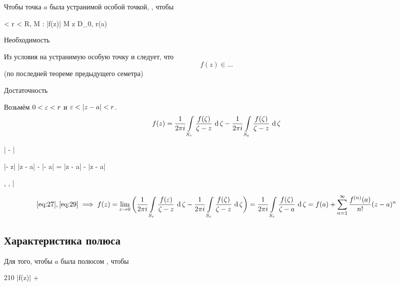 \begin{theorem}
	Чтобы точка $ a $ была устранимой особой точкой, , чтобы
	\begin{equ}{26}
		 < r < R, \quad \exist M : \quad |f(z)| \le M \quad \forall z \in D_{0, r}(a)
	\end{equ}
\end{theorem}

\begin{eproof}
	\item Необходимость

	Из условия на устранимую особую точку и  следует, что
	$$ f(z) \in \dots $$
	(по последней теореме предыдущего семетра)
	\item Достаточность

	Возьмём $ 0 < \veps < r $ и $ \veps < |z - a| < r $.
	$$ f(z) = \frac1{2\pi i} \cint[\zeta]{S_r}{\frac{f(\zeta)}{\zeta - z}} - \frac1{2\pi i}\cint[\zeta]{S_\veps}{\frac{f(\zeta)}{\zeta - z}} $$
	\begin{equ}{27}
		\bigg| -  \bigg| \le {} 
	\end{equ}
	\begin{equ}{28}
		|\zeta - z| \ge |z - a| - |\zeta - a| = |z - a| - \veps \ge {}|z - a|
	\end{equ}
	\begin{equ}{29}
		, ,  \implies \bigg| %
	\end{equ}
	$$ \eref{27}, \eref{29} \implies f(z) = \liml{\veps \to 0} \bigg( \frac1{2\pi i} \cint[\zeta]{S_r}{\frac{f(\veps)}{\zeta - z}} - \frac1{2\pi i} \cint[\zeta]{S_\veps}{\frac{f(\zeta)}{\zeta - z}} \bigg) = \frac1{2\pi i} \cint[\zeta]{S_r}{\frac{f(\zeta)}{\zeta - a}} = f(a) + \sum_{n = 1}^\infty \frac{\nder f(a)}{n!} (z - a)^n $$
\end{eproof}

\subsection{Характеристика полюса}

\begin{theorem}
	Для того, чтобы $ a $ была полюсом , чтобы
	\begin{equ}{210}
		|f(z)|  +\infty
	\end{equ}
\end{theorem}

